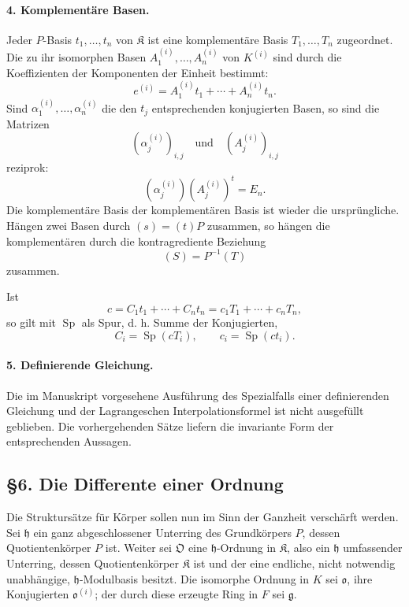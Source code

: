 \documentclass[11pt]{article}
\begin{document}
\paragraph{4. Komplementäre Basen.}
Jeder $P$-Basis $t_1,\ldots,t_n$ von $\mathfrak K$ ist eine komplementäre Basis $T_1,\ldots,T_n$ zugeordnet. Die zu ihr isomorphen Basen $A_1^{(i)},\ldots,A_n^{(i)}$ von $K^{(i)}$ sind durch die Koeffizienten der Komponenten der Einheit bestimmt:
\[
        e^{(i)}=A_1^{(i)}t_1+
        \cdots+A_n^{(i)}t_n.
\]
Sind $\alpha_1^{(i)},\ldots,\alpha_n^{(i)}$ die den $t_j$ entsprechenden konjugierten Basen, so sind die Matrizen
\[
        (\alpha_j^{(i)})_{i,j}
        \quad\text{und}\quad
        (A_j^{(i)})_{i,j}
\]
reziprok:
\[
        (\alpha_j^{(i)})(A_j^{(i)})^{t}=E_n.
\]
Die komplementäre Basis der komplementären Basis ist wieder die ursprüngliche. Hängen zwei Basen durch $(s)=(t)P$ zusammen, so hängen die komplementären durch die kontragrediente Beziehung
\[
        (S)=P^{-1}(T)
\]
zusammen.

Ist
\[
        c=C_1t_1+
        \cdots+C_nt_n
        =c_1T_1+
        \cdots+c_nT_n,
\]
so gilt mit $\operatorname{Sp}$ als Spur, d. h. Summe der Konjugierten,
\[
        C_i=\operatorname{Sp}(cT_i),
        \qquad
        c_i=\operatorname{Sp}(ct_i).
\]

\paragraph{5. Definierende Gleichung.}
Die im Manuskript vorgesehene Ausführung des Spezialfalls einer definierenden Gleichung und der Lagrangeschen Interpolationsformel ist nicht ausgefüllt geblieben. Die vorhergehenden Sätze liefern die invariante Form der entsprechenden Aussagen.

\subsection*{§6. Die Differente einer Ordnung}

Die Struktursätze für Körper sollen nun im Sinn der Ganzheit verschärft werden. Sei $\mathfrak h$ ein ganz abgeschlossener Unterring des Grundkörpers $P$, dessen Quotientenkörper $P$ ist. Weiter sei $\mathfrak O$ eine $\mathfrak h$-Ordnung in $\mathfrak K$, also ein $\mathfrak h$ umfassender Unterring, dessen Quotientenkörper $\mathfrak K$ ist und der eine endliche, nicht notwendig unabhängige, $\mathfrak h$-Modulbasis besitzt. Die isomorphe Ordnung in $K$ sei $\mathfrak o$, ihre Konjugierten $\mathfrak o^{(i)}$; der durch diese erzeugte Ring in $F$ sei $\mathfrak g$.
\end{document}
